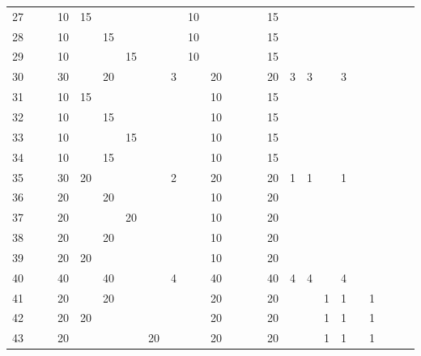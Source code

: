 \begin{table}
\begin{tabular}{r|g c g c g c g c g c g c g c g c g c g c g c g}
  27 &    &    & 10 & 15 &    &    &    &   & 10 &    &    &    &    & 15 &   &   &    &   &   &   &   &   &   \\
  28 &    &    & 10 &    & 15 &    &    &   & 10 &    &    &    &    & 15 &   &   &    &   &   &   &   &   &   \\
  29 &    &    & 10 &    &    & 15 &    &   & 10 &    &    &    &    & 15 &   &   &    &   &   &   &   &   &   \\
  30 &    &    & 30 &    & 20 &    &    & 3 &    & 20 &    &    &    & 20 & 3 & 3 &    & 3 &   &   &   &   &   \\
  31 &    &    & 10 & 15 &    &    &    &   &    & 10 &    &    &    & 15 &   &   &    &   &   &   &   &   &   \\
  32 &    &    & 10 &    & 15 &    &    &   &    & 10 &    &    &    & 15 &   &   &    &   &   &   &   &   &   \\
  33 &    &    & 10 &    &    & 15 &    &   &    & 10 &    &    &    & 15 &   &   &    &   &   &   &   &   &   \\
  34 &    &    & 10 &    & 15 &    &    &   &    & 10 &    &    &    & 15 &   &   &    &   &   &   &   &   &   \\
  35 &    &    & 30 & 20 &    &    &    & 2 &    & 20 &    &    &    & 20 & 1 & 1 &    & 1 &   &   &   &   &   \\
  36 &    &    & 20 &    & 20 &    &    &   &    & 10 &    &    &    & 20 &   &   &    &   &   &   &   &   &   \\
  37 &    &    & 20 &    &    & 20 &    &   &    & 10 &    &    &    & 20 &   &   &    &   &   &   &   &   &   \\
  38 &    &    & 20 &    & 20 &    &    &   &    & 10 &    &    &    & 20 &   &   &    &   &   &   &   &   &   \\
  39 &    &    & 20 & 20 &    &    &    &   &    & 10 &    &    &    & 20 &   &   &    &   &   &   &   &   &   \\
  40 &    &    & 40 &    & 40 &    &    & 4 &    & 40 &    &    &    & 40 & 4 & 4 &    & 4 &   &   &   &   &   \\
  41 &    &    & 20 &    & 20 &    &    &   &    & 20 &    &    &    & 20 &   &   & 1  & 1 &   & 1 &   &   &   \\
  42 &    &    & 20 & 20 &    &    &    &   &    & 20 &    &    &    & 20 &   &   & 1  & 1 &   & 1 &   &   &   \\
  43 &    &    & 20 &    &    &    & 20 &   &    & 20 &    &    &    & 20 &   &   & 1  & 1 &   & 1 &   &   &   \\

\end{tabular}
\end{table}
